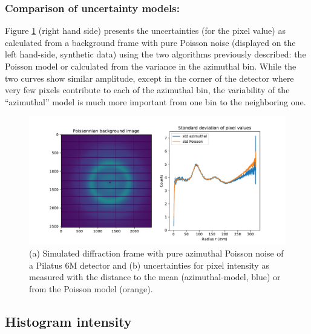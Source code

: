 \documentclass[preprint]{iucr}              %
\begin{document}
\subsubsection{Comparison of uncertainty models:}
Figure \ref{fig_std} (right hand side) presents the uncertainties (for the pixel value) as calculated from a background frame with pure Poisson noise (displayed on the left hand-side, synthetic data) using the two algorithms previously described: the Poisson model or calculated from the variance in the azimuthal bin.
While the two curves show similar amplitude, except in the corner of the detector where very few pixels contribute to each of the azimuthal bin, the variability of the ``azimuthal'' model is much more important from one bin to the neighboring one.
\begin{figure}
\label{fig_std}
\begin{center}
\includegraphics[width=14cm]{fig_std}
\caption{(a) Simulated diffraction frame with pure azimuthal Poisson noise of a Pilatus 6M detector and (b) uncertainties for pixel intensity as measured with the distance to the mean (azimuthal-model, blue) or from the Poisson model (orange).}
\end{center}
\end{figure}

\subsection{Histogram intensity }
\end{document}
